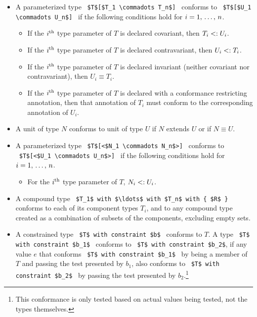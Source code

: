 \begin{itemize}
  \item  A parameterized type ~\lstinline!$T$[$T_1 \commadots T_n$]!~ conforms to ~\lstinline!$T$[$U_1 \commadots U_n$]!~ if the following conditions hold for $i = 1 ,\, \ldots ,\, n$.
    \begin{itemize}
      \item If the $i^{\mbox{\scriptsize th}}$ type parameter of $T$ is declared covariant, then $T_i <: U_i$.
      \item If the $i^{\mbox{\scriptsize th}}$ type parameter of $T$ is declared contravariant, then $U_i <: T_i$.
      \item If the $i^{\mbox{\scriptsize th}}$ type parameter of $T$ is declared invariant (neither covariant nor contravariant), then $U_i \equiv T_i$.
      \item If the $i^{\mbox{\scriptsize th}}$ type parameter of $T$ is declared with a conformance restricting annotation, then that annotation of $T_i$ must conform to the corresponding annotation of $U_i$. 
    \end{itemize}

  \item A unit of type $N$ conforms to unit of type $U$ if $N$ extends $U$ or if $N \equiv U$. 

  \item A parameterized type ~\lstinline!$T$[<$N_1 \commadots N_n$>]!~ conforms to ~\lstinline!$T$[<$U_1 \commadots U_n$>]!~ if the following conditions hold for $i = 1 ,\, \ldots ,\, n$.
    \begin{itemize}
      \item For the $i^{\mbox{\scriptsize th}}$ type parameter of $T$, $N_i <: U_i$.
    \end{itemize}

  \item A compound type ~\lstinline!$T_1$ with $\ldots$ with $T_n$ with { $R$ }!~ conforms to each of its component types $T_i$, and to any compound type created as a combination of subsets of the components, excluding empty sets. 

  \item A constrained type ~\lstinline!$T$ with constraint $b$!~ conforms to $T$. A type ~\lstinline!$T$ with constraint $b_1$!~ conforms to ~\lstinline!$T$ with constraint $b_2$!, if any value $e$ that conforms ~\lstinline!$T$ with constraint $b_1$!~ by being a member of $T$ and passing the test presented by $b_1$, also conforms to ~\lstinline!$T$ with constraint $b_2$!~ by passing the test presented by $b_2$.\footnote{This conformance is only tested based on actual values being tested, not the types themselves.}


\end{itemize}
